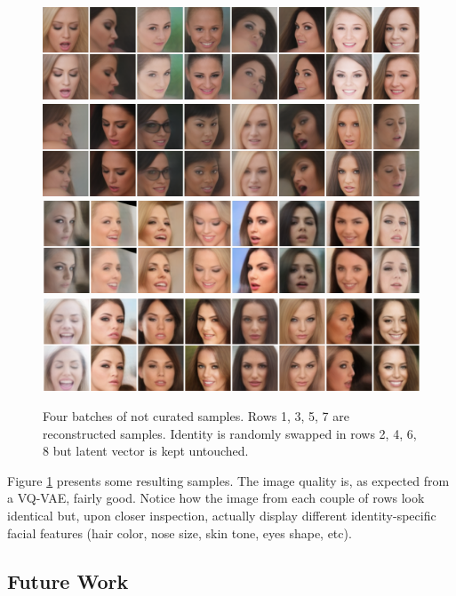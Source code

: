 \begin{figure}[ht]
    \centering
    \includegraphics[scale=1.5]{60-files/resampled-1.png}
    \includegraphics[scale=1.5]{60-files/resampled-2.png}
    \includegraphics[scale=1.5]{60-files/resampled-3.png}
    \includegraphics[scale=1.5]{60-files/resampled-4.png}
    \caption{Four batches of not curated samples. Rows 1, 3, 5, 7 are reconstructed samples. Identity is randomly swapped in rows 2, 4, 6, 8 but latent vector is kept untouched.}
    \label{fig:vqvae-facegen-samples}
\end{figure}

Figure \ref{fig:vqvae-facegen-samples} presents some resulting samples. The image quality is, as expected from a VQ-VAE, fairly good. Notice how the image from each couple of rows look identical but, upon closer inspection, actually display different identity-specific facial features (hair color, nose size, skin tone, eyes shape, etc).

\subsection{Future Work}

